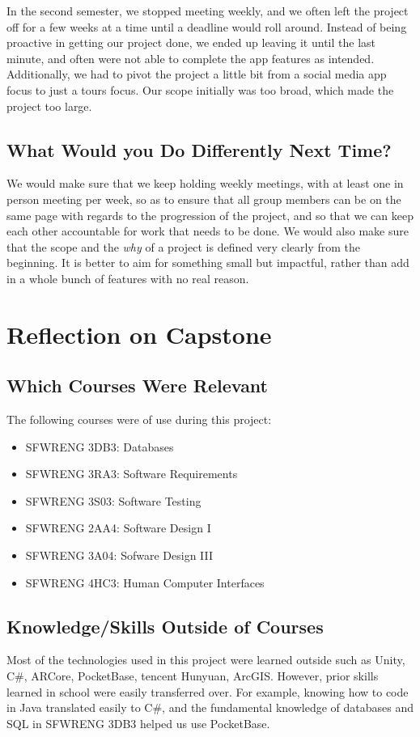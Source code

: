 \documentclass{article}
\begin{document}
In the second semester, we stopped meeting weekly, and we often left the project off for a few weeks at a time until a deadline would roll around. Instead of being proactive in getting our project done, we ended up leaving it until the last minute, and often were not able to complete the app features as intended. Additionally, we had to pivot the project a little bit from a social media app focus to just a tours focus. Our scope initially was too broad, which made the project too large.

\subsection{What Would you Do Differently Next Time?}

We would make sure that we keep holding weekly meetings, with at least one in person meeting per week, so as to ensure that all group members can be on the same page with regards to the progression of the project, and so that we can keep each other accountable for work that needs to be done. We would also make sure that the scope and the \textit{why} of a project is defined very clearly from the beginning. It is better to aim for something small but impactful, rather than add in a whole bunch of features with no real reason.

\section{Reflection on Capstone}

\subsection{Which Courses Were Relevant}

The following courses were of use during this project:
\begin{itemize}
    \item SFWRENG 3DB3: Databases
    \item SFWRENG 3RA3: Software Requirements
    \item SFWRENG 3S03: Software Testing
    \item SFWRENG 2AA4: Software Design I
    \item SFWRENG 3A04: Sofware Design III
    \item SFWRENG 4HC3: Human Computer Interfaces
\end{itemize}

\subsection{Knowledge/Skills Outside of Courses}

Most of the technologies used in this project were learned outside such as Unity, C\#, ARCore, PocketBase, tencent Hunyuan, ArcGIS. However, prior skills learned in school were easily transferred over. For example, knowing how to code in Java translated easily to C\#, and the fundamental knowledge of databases and SQL in SFWRENG 3DB3 helped us use PocketBase.
\end{document}
